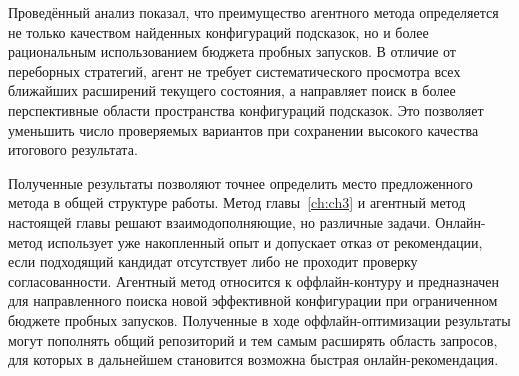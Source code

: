 Проведённый анализ показал, что преимущество агентного метода определяется не только качеством найденных конфигураций подсказок, но и более рациональным использованием бюджета пробных запусков. В отличие от переборных стратегий, агент не требует систематического просмотра всех ближайших расширений текущего состояния, а направляет поиск в более перспективные области пространства конфигураций подсказок. Это позволяет уменьшить число проверяемых вариантов при сохранении высокого качества итогового результата.

Полученные результаты позволяют точнее определить место предложенного метода в общей структуре работы. Метод главы~\ref{ch:ch3} и агентный метод настоящей главы решают взаимодополняющие, но различные задачи. Онлайн-метод использует уже накопленный опыт и допускает отказ от рекомендации, если подходящий кандидат отсутствует либо не проходит проверку согласованности. Агентный метод относится к оффлайн-контуру и предназначен для направленного поиска новой эффективной конфигурации при ограниченном бюджете пробных запусков. Полученные в ходе оффлайн-оптимизации результаты могут пополнять общий репозиторий и тем самым расширять область запросов, для которых в дальнейшем становится возможна быстрая онлайн-рекомендация.

\clearpage

